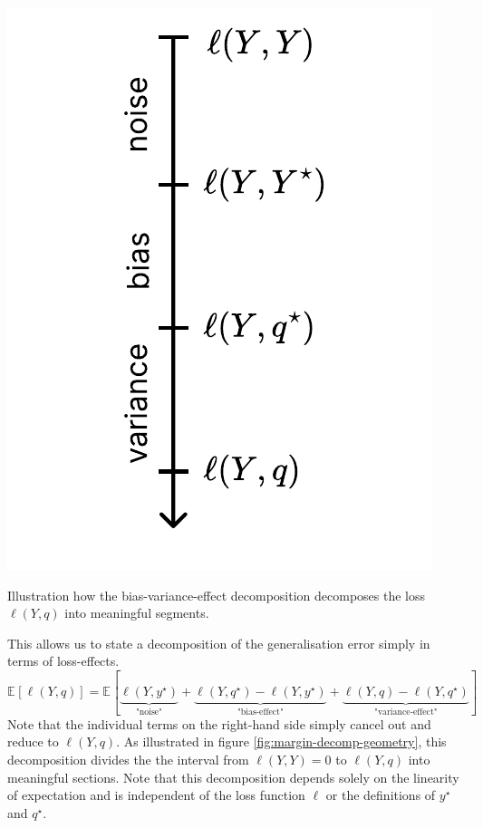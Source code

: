 \documentclass[
    a4paper, %
	fontsize=10pt, %
	twoside=false, %
]{kaobook}
\begin{document}
\begin{marginfigure}
  \label{fig:margin-decomp-geometry}
  \includegraphics[width=\textwidth]{figma-illustrations/effect-decomp.pdf}
  \caption{
    Illustration how the bias-variance-effect decomposition decomposes the loss $\ell(Y, q)$ into meaningful segments.
  }
\end{marginfigure}

This allows us to state a decomposition of the generalisation error simply in terms of loss-effects.
$$
\mathbb{E}_{}\left[ \ell(Y,q) \right]  = \mathbb{E}_{}\left[  \underbrace{ \ell(Y, y^\star) }_{\text{"noise"} }
+
\underbrace{ \ell(Y, q^\star) - \ell(Y, y^\star) }_{\text{"bias-effect"} }
+ 
\underbrace{ \ell(Y, q) - \ell(Y, q^\star) }_{\text{"variance-effect"} } \right]
$$
Note that the individual terms on the right-hand side simply cancel out and reduce to $\ell(Y, q)$. As illustrated in figure \ref{fig:margin-decomp-geometry}, this decomposition divides the the interval from $\ell(Y, Y) = 0$ to $\ell(Y, q)$ into meaningful sections. 
Note that this decomposition depends solely on the linearity of expectation and is independent of the loss function $\ell$ or the definitions of $y^\star$ and $q^\star$.
\end{document}
